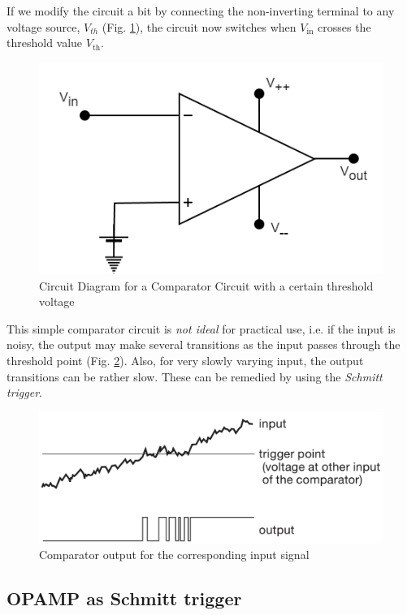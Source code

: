 If we modify the circuit a bit by connecting the non-inverting terminal to any voltage source, $V_{th}$ (Fig. \ref{comp2}), the circuit now switches when $V_\text{in}$ crosses the threshold value $V_\text{th}$.

\begin{figure}[H]
    \centering
    \includegraphics[width=0.8\columnwidth]{images/comp2.png}
    \caption{Circuit Diagram for a Comparator Circuit with a certain threshold voltage}
    \label{comp2}
\end{figure}

This simple comparator circuit is \textit{not ideal} for practical use, i.e. if the input is noisy, the output may make several transitions as the input passes through the threshold point (Fig. \ref{comp3}). Also, for very slowly varying input, the output transitions can be rather slow. These can be remedied by using the \textit{Schmitt trigger}.

\begin{figure}[H]
    \centering
    \includegraphics[width=0.85\columnwidth]{images/comp3.png}
    \caption{Comparator output for the corresponding input signal}
    \label{comp3}
\end{figure}


\subsection{OPAMP as Schmitt trigger}

